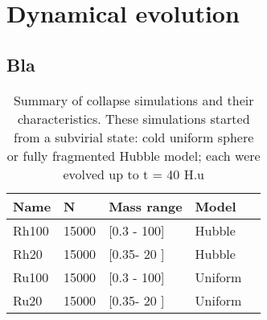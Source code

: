 


\chapter{Dynamical evolution} 
\label{ChapterDE}


\section{Bla}


%

%
\begin{table}
\begin{center}
\caption{Summary of collapse simulations and their characteristics. These simulations started from a subvirial state: cold uniform sphere or fully fragmented Hubble model; each were evolved up to t = 40 H.u}
\label{Tab:evolution_models}
\begin{tabularx}{\linewidth}{XXlXX}
\hline
Name & N & Mass range & Model \\
\hline
Rh100 & 15000 & [0.3 - 100] & Hubble  \\
Rh20 & 15000 & [0.35- 20 ] & Hubble  \\
Ru100 & 15000 & [0.3 - 100] & Uniform  \\
Ru20 & 15000 & [0.35- 20 ] & Uniform  \\
\hline
\end{tabularx}
\end{center}
\end{table}



